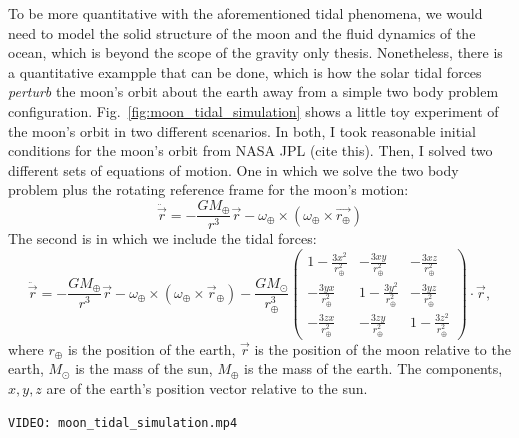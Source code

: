             To be more quantitative with the aforementioned tidal phenomena, we would need to model the solid structure of the moon and the fluid dynamics of the ocean, which is beyond the scope of the gravity only thesis. Nonetheless, there is a quantitative exampple that can be done, which is how the solar tidal forces \textit{perturb} the moon's orbit about the earth away from a simple two body problem configuration. Fig.~\ref{fig:moon_tidal_simulation} shows a little toy experiment of the moon's orbit in two different scenarios. In both, I took reasonable initial conditions for the moon's orbit from NASA JPL (cite this). Then, I solved two different sets of equations of motion. One in which we solve the two body problem plus the rotating reference frame for the moon's motion:
            \begin{equation}
                \ddot{\vec{r}} = -\frac{GM_\oplus}{r^3}\vec{r} - \omega_\oplus \times \left(\omega_\oplus\times\vec{r_\oplus}\right)
            \end{equation}
            The second is in which we include the tidal forces:
            \begin{equation}
                \ddot{\vec{r}} = -\frac{GM_\oplus}{r^3}\vec{r} - \omega_\oplus \times \left(\omega_\oplus\times\vec{r}_\oplus\right) -\frac{GM_\odot}{r_\oplus^3}\left(\begin{matrix}
                    1-\frac{3x^2}{r_\oplus^2} & -\frac{3xy}{r_\oplus^2} & -\frac{3xz}{r_\oplus^2} \\
                    -\frac{3yx}{r_\oplus^2} & 1-\frac{3y^2}{r_\oplus^2} & -\frac{3yz}{r_\oplus^2} \\
                    -\frac{3zx}{r_\oplus^2} & -\frac{3zy}{r_\oplus^2} & 1-\frac{3z^2}{r_\oplus^2}
                \end{matrix}  \right)\cdot \vec{r},
            \end{equation}            
            where $r_\oplus$ is the position of the earth, $\vec{r}$ is the position of the moon relative to the earth, $M_\odot$ is the mass of the sun, $M_\oplus$ is the mass of the earth. The components, $x,y,z$ are of the earth's position vector relative to the sun. 





            
            
\begin{verbatim}
VIDEO: moon_tidal_simulation.mp4
\end{verbatim}

